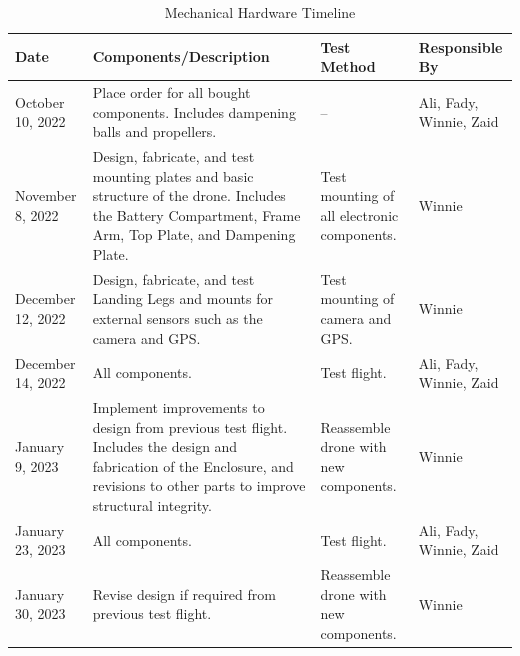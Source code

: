 \documentclass[12pt, titlepage]{article}
\begin{document}
\begin{table}[!h]
\begin{center}
\caption {Mechanical Hardware Timeline}
\label{tab:mechTimeline}
\begin{tabular}{ | m{2.5cm} | m{7.5cm} | m{3cm} | m{2cm} | } 
\hline
Date & Components/Description & Test Method & Responsible By \\
\hline
October 10, 2022 & Place order for all bought components. Includes dampening balls and propellers. & 
    -- & Ali, Fady, Winnie, Zaid \\
\hline
November 8, 2022 & Design, fabricate, and test mounting plates and basic structure of the drone. Includes the Battery Compartment, Frame Arm, Top Plate, and Dampening Plate. & 
    Test mounting of all electronic components. & Winnie \\
\hline
December 12, 2022 & Design, fabricate, and test Landing Legs and mounts for external sensors such as the camera and GPS. & 
    Test mounting of camera and GPS. & Winnie \\
\hline
December 14, 2022 & All components. & 
    Test flight. & Ali, Fady, Winnie, Zaid \\
\hline
January 9, 2023 & Implement improvements to design from previous test flight. Includes the design and fabrication of the Enclosure, and revisions to other parts to improve structural integrity. & 
    Reassemble drone with new components. & Winnie \\
\hline
January 23, 2023 & All components. & 
    Test flight. & Ali, Fady, Winnie, Zaid \\
\hline
January 30, 2023 & Revise design if required from previous test flight. & 
    Reassemble drone with new components. & Winnie \\
\hline
\end{tabular}
\end{center}
\end{table}
\end{document}
